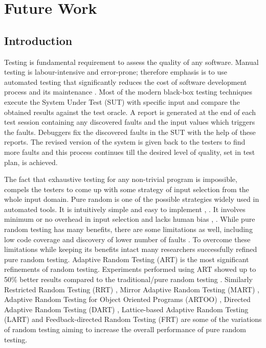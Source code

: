 \chapter{Future Work}
\label{chap:futureWork}

\section{Introduction}\label{sec:intro8}

Testing is fundamental requirement to assess the quality of any software. Manual testing is labour-intensive and error-prone; therefore emphasis is to use automated testing that significantly reduces the cost of software development process and its maintenance \cite{beizer1995black}. Most of the modern black-box testing techniques execute the System Under Test (SUT) with specific input and compare the obtained results against the test oracle. A report is generated at the end of each test session containing any discovered faults and the input values which triggers the faults. Debuggers fix the discovered faults in the SUT with the help of these reports. The revised version of the system is given back to the testers to find more faults and this process continues till the desired level of quality, set in test plan, is achieved.

The fact that exhaustive testing for any non-trivial program is impossible, compels the testers to come up with some strategy of input selection from the whole input domain. Pure random is one of the possible strategies widely used in automated tools. It is intuitively simple and easy to implement \cite{Ciupa2008},  \cite{Forrester2000}. It involves minimum or no overhead in input selection and lacks human bias \cite{hamlet1994},  \cite{Linger1993}. While pure random testing has many benefits, there are some limitations as well, including low code coverage \cite{Offutt1996} and discovery of lower number of faults \cite{Chen1994}. To overcome these limitations while keeping its benefits intact many researchers successfully refined pure random testing. Adaptive Random Testing (ART) is the most significant refinements of random testing. Experiments performed using ART showed up to 50\% better results compared to the traditional/pure random testing  \cite{Chen2008}.  Similarly Restricted Random Testing (RRT) \cite{Chan2002}, Mirror Adaptive Random Testing (MART)  \cite{Chen2004}, Adaptive Random Testing for Object Oriented Programs (ARTOO) \cite{Ciupa2008}, Directed Adaptive Random Testing (DART)  \cite{Godefroid2005}, Lattice-based Adaptive Random Testing (LART) \cite{Mayer2005} and Feedback-directed Random Testing (FRT) \cite{Pacheco2007} are some of the variations of random testing aiming to increase the overall performance of pure random testing.


